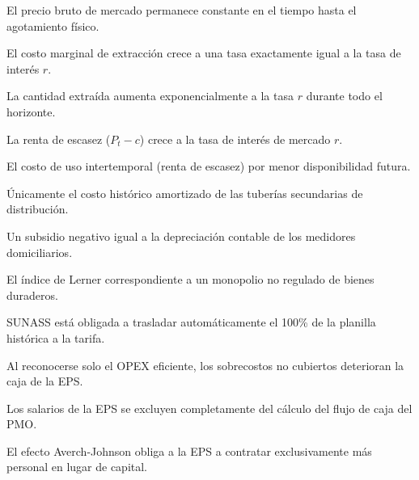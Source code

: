 \begin{opts}
    \item El precio bruto de mercado permanece constante en el tiempo hasta el agotamiento físico.
    \item El costo marginal de extracción crece a una tasa exactamente igual a la tasa de interés $r$.
    \item La cantidad extraída aumenta exponencialmente a la tasa $r$ durante todo el horizonte.
    \item La renta de escasez ($P_t - c$) crece a la tasa de interés de mercado $r$.
\end{opts}

\begin{opts}
    \item El costo de uso intertemporal (renta de escasez) por menor disponibilidad futura.
    \item Únicamente el costo histórico amortizado de las tuberías secundarias de distribución.
    \item Un subsidio negativo igual a la depreciación contable de los medidores domiciliarios.
    \item El índice de Lerner correspondiente a un monopolio no regulado de bienes duraderos.
\end{opts}

\begin{opts}
    \item SUNASS está obligada a trasladar automáticamente el 100\% de la planilla histórica a la tarifa.
    \item Al reconocerse solo el OPEX eficiente, los sobrecostos no cubiertos deterioran la caja de la EPS.
    \item Los salarios de la EPS se excluyen completamente del cálculo del flujo de caja del PMO.
    \item El efecto Averch-Johnson obliga a la EPS a contratar exclusivamente más personal en lugar de capital.
\end{opts}

